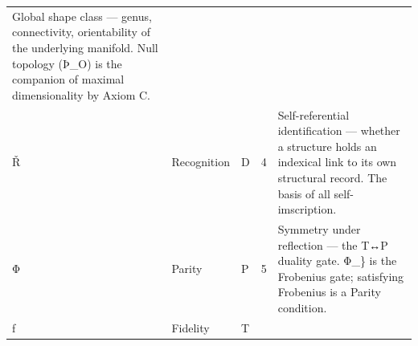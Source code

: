 \documentclass[12pt,a4paper]{article}
\begin{document}
\begin{longtable}[]{@{}lllll@{}}
\begin{minipage}[t]{0.27\columnwidth}
Global shape class --- genus, connectivity, orientability of the
underlying manifold. Null topology (Þ\_O) is the companion of maximal
dimensionality by Axiom C.\strut
\end{minipage}\tabularnewline
\begin{minipage}[t]{0.14\columnwidth}\raggedright
Ř\strut
\end{minipage} & \begin{minipage}[t]{0.12\columnwidth}\raggedright
Recognition\strut
\end{minipage} & \begin{minipage}[t]{0.16\columnwidth}\raggedright
D\strut
\end{minipage} & \begin{minipage}[t]{0.16\columnwidth}\raggedright
4\strut
\end{minipage} & \begin{minipage}[t]{0.27\columnwidth}\raggedright
Self-referential identification --- whether a structure holds an
indexical link to its own structural record. The basis of all
self-imscription.\strut
\end{minipage}\tabularnewline
\begin{minipage}[t]{0.14\columnwidth}\raggedright
Φ\strut
\end{minipage} & \begin{minipage}[t]{0.12\columnwidth}\raggedright
Parity\strut
\end{minipage} & \begin{minipage}[t]{0.16\columnwidth}\raggedright
P\strut
\end{minipage} & \begin{minipage}[t]{0.16\columnwidth}\raggedright
5\strut
\end{minipage} & \begin{minipage}[t]{0.27\columnwidth}\raggedright
Symmetry under reflection --- the T↔P duality gate. Φ\_\} is the
Frobenius gate; satisfying Frobenius is a Parity condition.\strut
\end{minipage}\tabularnewline
\begin{minipage}[t]{0.14\columnwidth}\raggedright
ƒ\strut
\end{minipage} & \begin{minipage}[t]{0.12\columnwidth}\raggedright
Fidelity\strut
\end{minipage} & \begin{minipage}[t]{0.16\columnwidth}\raggedright
T\strut
\end{minipage} & \begin{minipage}[t]{0.16\columnwidth}\raggedright

\end{minipage}
\end{longtable}
\end{document}
